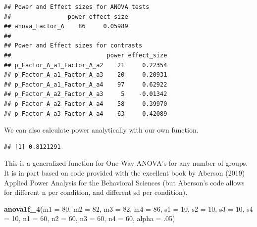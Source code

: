 \documentclass[]{book}
\newenvironment{Shaded}{\begin{snugshade}}{\end{snugshade}}
\newcommand{\CommentTok}[1]{\textcolor[rgb]{0.56,0.35,0.01}{\textit{#1}}}
\newcommand{\DataTypeTok}[1]{\textcolor[rgb]{0.13,0.29,0.53}{#1}}
\newcommand{\DecValTok}[1]{\textcolor[rgb]{0.00,0.00,0.81}{#1}}
\newcommand{\FloatTok}[1]{\textcolor[rgb]{0.00,0.00,0.81}{#1}}
\newcommand{\KeywordTok}[1]{\textcolor[rgb]{0.13,0.29,0.53}{\textbf{#1}}}
\newcommand{\NormalTok}[1]{#1}
\newcommand{\OperatorTok}[1]{\textcolor[rgb]{0.81,0.36,0.00}{\textbf{#1}}}
\begin{document}
\begin{verbatim}
## Power and Effect sizes for ANOVA tests
##                power effect_size
## anova_Factor_A    86     0.05989
## 
## Power and Effect sizes for contrasts
##                           power effect_size
## p_Factor_A_a1_Factor_A_a2    21     0.22354
## p_Factor_A_a1_Factor_A_a3    20     0.20931
## p_Factor_A_a1_Factor_A_a4    97     0.62922
## p_Factor_A_a2_Factor_A_a3     5    -0.01342
## p_Factor_A_a2_Factor_A_a4    58     0.39970
## p_Factor_A_a3_Factor_A_a4    63     0.42089
\end{verbatim}

We can also calculate power analytically with our own function.

\begin{Shaded}
\end{Shaded}

\begin{verbatim}
## [1] 0.8121291
\end{verbatim}

This is a generalized function for One-Way ANOVA's for any number of groups. It is in part based on code provided with the excellent book by Aberson (2019) Applied Power Analysis for the Behavioral Sciences (but Aberson's code allows for different n per condition, and different sd per condition).

\begin{Shaded}
\begin{Highlighting}[]
\KeywordTok{anova1f_4}\NormalTok{(}\DataTypeTok{m1 =} \DecValTok{80}\NormalTok{, }\DataTypeTok{m2 =} \DecValTok{82}\NormalTok{, }\DataTypeTok{m3 =} \DecValTok{82}\NormalTok{, }\DataTypeTok{m4 =} \DecValTok{86}\NormalTok{,}
          \DataTypeTok{s1 =} \DecValTok{10}\NormalTok{, }\DataTypeTok{s2 =} \DecValTok{10}\NormalTok{, }\DataTypeTok{s3 =} \DecValTok{10}\NormalTok{, }\DataTypeTok{s4 =} \DecValTok{10}\NormalTok{,}
          \DataTypeTok{n1 =} \DecValTok{60}\NormalTok{, }\DataTypeTok{n2 =} \DecValTok{60}\NormalTok{, }\DataTypeTok{n3 =} \DecValTok{60}\NormalTok{, }\DataTypeTok{n4 =} \DecValTok{60}\NormalTok{,}
          \DataTypeTok{alpha =} \FloatTok{.05}\NormalTok{)}
\end{Highlighting}
\end{Shaded}
\end{document}
